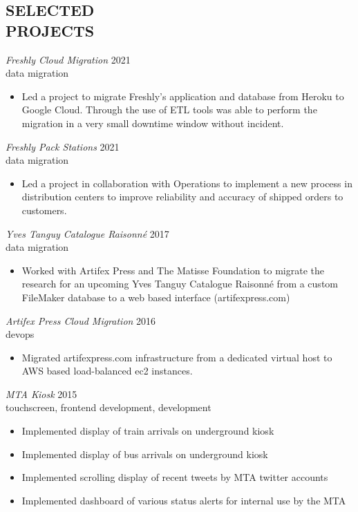 \documentclass[line,margin]{res}
\begin{document}
\begin{resume}
    \section{SELECTED \\ PROJECTS}
     {\sl Freshly Cloud Migration}
    \hfill 2021 \\
    data migration
    \begin{itemize} \itemsep -2pt
        \item
              Led a project to migrate Freshly's application and database from Heroku
              to Google Cloud. Through the use of ETL tools was able to perform the
              migration in a very small downtime window without incident.
    \end{itemize}

    {\sl Freshly Pack Stations}
    \hfill 2021 \\
    data migration
    \begin{itemize} \itemsep -2pt
        \item
              Led a project in collaboration with Operations to implement a new process
              in distribution centers to improve reliability and accuracy of shipped orders
              to customers.
    \end{itemize}

    {\sl Yves Tanguy Catalogue Raisonné}
    \hfill 2017 \\
    data migration
    \begin{itemize} \itemsep -2pt
        \item
              Worked with Artifex Press and The Matisse Foundation to migrate the
              research for an upcoming Yves Tanguy Catalogue Raisonné from a
              custom FileMaker database to a web based interface (artifexpress.com)
    \end{itemize}

    {\sl Artifex Press Cloud Migration}
    \hfill 2016 \\
    devops
    \begin{itemize} \itemsep -2pt
        \item
              Migrated artifexpress.com infrastructure from a dedicated virtual host to
              AWS based load-balanced ec2 instances.
    \end{itemize}

    {\sl MTA Kiosk}
    \hfill 2015 \\
    touchscreen, frontend development, development
    \begin{itemize} \itemsep -2pt
        \item
              Implemented display of train arrivals on underground kiosk
        \item
              Implemented display of bus arrivals on underground kiosk
        \item
              Implemented scrolling display of recent tweets by MTA twitter accounts
        \item
              Implemented dashboard of various status alerts for internal use by the MTA
    \end{itemize}


\end{resume}
\end{document}
